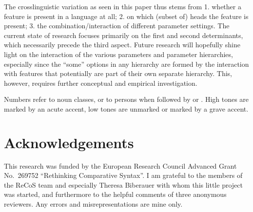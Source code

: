 \documentclass[output=paper]{langsci/langscibook}
\begin{document}
The crosslinguistic variation as seen in this paper thus stems from 1. whether
a feature is present in a language at all; 2. on which (subset of) heads the
feature is present; 3. the combination/interaction of different parameter
settings. The current state of research focuses primarily on the first and
second determinants, which necessarily precede the third aspect. Future
research will hopefully shine light on the interaction of the various
parameters and parameter hierarchies, especially since the \enquote{some} options in
any hierarchy are formed by the interaction with features that potentially are
part of their own separate hierarchy. This, however, requires further
conceptual and empirical investigation.

\printchapterglossary{}

Numbers refer to noun classes, or to persons when followed by \Sg{} or \Pl{}.
High tones are marked by an acute accent, low tones are unmarked or marked by a
grave accent.

\section*{Acknowledgements}

This research was funded by the European Research Council Advanced Grant No.\
269752 \enquote{Rethinking Comparative Syntax}. I am grateful to the members of
the ReCoS team and especially Theresa Biberauer with whom this little project
was started, and furthermore to the helpful comments of three anonymous
reviewers.  Any errors and misrepresentations are mine only.

{\sloppy
\printbibliography[heading=subbibliography,notkeyword=this]
}
\end{document}
